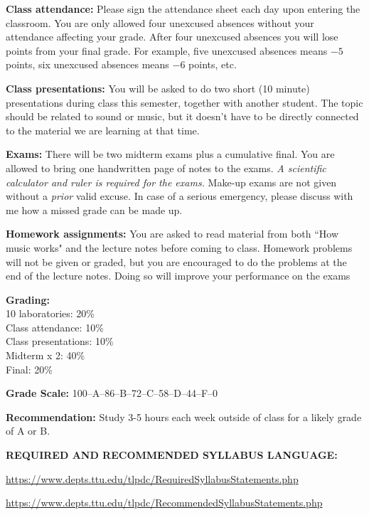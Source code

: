 \documentclass[11pt]{NSF}
\begin{document}
{\bf Class attendance:}
Please sign the attendance sheet each day upon entering 
the classroom.
You are only allowed four unexcused absences without your
attendance affecting your grade.
After four unexcused absences you will lose points from your
final grade.
For example, five unexcused absences means $-5$ points, six 
unexcused absences means $-6$ points, etc.
 
{\bf Class presentations:}
You will be asked to do two short (10 minute) presentations 
during class this semester, together with another student.
The topic should be related to sound or music, but it doesn't
have to be directly connected to the material we are learning
at that time.

{\bf Exams:}
There will be two midterm exams plus a cumulative final.
You are allowed to bring one handwritten page of notes to the exams.
{\em A scientific calculator and ruler is required for the exams.}
Make-up exams are not given without a {\em prior} valid excuse.
In case of a serious emergency, please discuss with me how a missed
grade can be made up.

{\bf Homework assignments:}
You are asked to read material from both ``How music works" and
the lecture notes before coming to class.
Homework problems will not be given or graded, but you are
encouraged to do the problems at the end of the lecture notes.
Doing so will improve your performance on the exams

{\bf Grading:}\\
10 laboratories: 20\%\\
Class attendance: 10\%\\
Class presentations: 10\%\\
Midterm x 2: 40\%\\
Final: 20\%

{\bf Grade Scale:} 100--A--86--B--72--C--58--D--44--F--0
 
{\bf Recommendation:} 
Study 3-5 hours each week outside of class for a likely grade of A or B.

{\bf REQUIRED AND RECOMMENDED SYLLABUS LANGUAGE:}

\url{https://www.depts.ttu.edu/tlpdc/RequiredSyllabusStatements.php}

\url{https://www.depts.ttu.edu/tlpdc/RecommendedSyllabusStatements.php}
\end{document}
